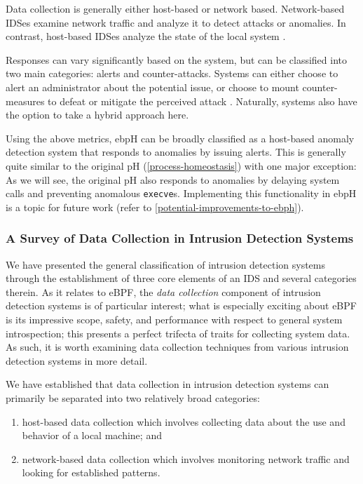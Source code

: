 \documentclass[
  12pt]{findlay}
\newcommand{\passthrough}[1]{#1}
\providecommand{\tightlist}{%
  \setlength{\itemsep}{0pt}\setlength{\parskip}{0pt}}
\begin{document}
Data collection is generally either host-based or network based.
Network-based IDSes examine network traffic and analyze it to detect
attacks or anomalies. In contrast, host-based IDSes analyze the state of
the local system \autocite{kemmerer02,soma02}.

Responses can vary significantly based on the system, but can be
classified into two main categories: alerts and counter-attacks. Systems
can either choose to alert an administrator about the potential issue,
or choose to mount counter-measures to defeat or mitigate the perceived
attack \autocite{kemmerer02}. Naturally, systems also have the option to
take a hybrid approach here.

Using the above metrics, ebpH can be broadly classified as a host-based
anomaly detection system that responds to anomalies by issuing alerts.
This is generally quite similar to the original pH
(\autoref{process-homeostasis}) with one major exception: As we will
see, the original pH also responds to anomalies by delaying system calls
\autocite{soma02} and preventing anomalous
\passthrough{\lstinline!execve!}s. Implementing this functionality in
ebpH is a topic for future work (refer to
\autoref{potential-improvements-to-ebph}).

\hypertarget{a-survey-of-data-collection-in-intrusion-detection-systems}{%
\subsubsection{A Survey of Data Collection in Intrusion Detection
Systems}\label{a-survey-of-data-collection-in-intrusion-detection-systems}}

We have presented the general classification of intrusion detection
systems through the establishment of three core elements of an IDS and
several categories therein. As it relates to eBPF, the \emph{data
collection} component of intrusion detection systems is of particular
interest; what is especially exciting about eBPF is its impressive
scope, safety, and performance with respect to general system
introspection; this presents a perfect trifecta of traits for collecting
system data. As such, it is worth examining data collection techniques
from various intrusion detection systems in more detail.

We have established that data collection in intrusion detection systems
can primarily be separated into two relatively broad categories:

\begin{enumerate}
\def\labelenumi{(\arabic{enumi})}
\tightlist
\item
  host-based data collection which involves collecting data about the
  use and behavior of a local machine; and
\item
  network-based data collection which involves monitoring network
  traffic and looking for established patterns.
\end{enumerate}
\end{document}
